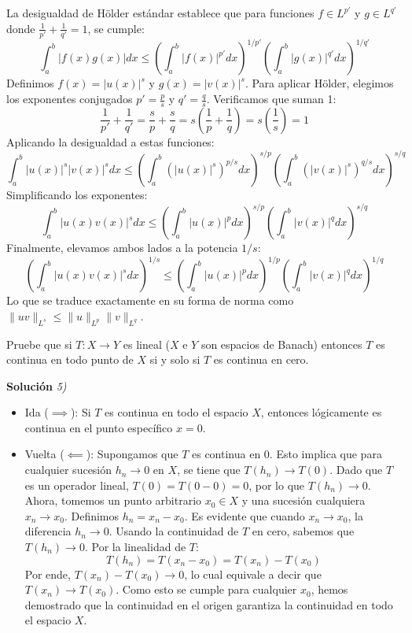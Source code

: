 \documentclass[11pt,spanish]{article}
\newcounter{problema}
\newcommand{\prob}{\stepcounter{problema} \vspace{.5cm} \noindent{\bf Problema \arabic{problema}: }}
\begin{document}
La desigualdad de Hölder estándar establece que para funciones $f \in L^{p'}$ y $g \in L^{q'}$ donde $\frac{1}{p'} + \frac{1}{q'} = 1$, se cumple:
$$\int_a^b |f(x)g(x)| dx \le \left( \int_a^b |f(x)|^{p'} dx \right)^{1/p'} \left( \int_a^b |g(x)|^{q'} dx \right)^{1/q'}$$
Definimos $f(x) = |u(x)|^s$ y $g(x) = |v(x)|^s$. Para aplicar Hölder, elegimos los exponentes conjugados $p' = \frac{p}{s}$ y $q' = \frac{q}{s}$. Verificamos que suman 1:
$$\frac{1}{p'} + \frac{1}{q'} = \frac{s}{p} + \frac{s}{q} = s \left( \frac{1}{p} + \frac{1}{q} \right) = s \left( \frac{1}{s} \right) = 1$$
Aplicando la desigualdad a estas funciones:
$$\int_a^b |u(x)|^s |v(x)|^s dx \le \left( \int_a^b (|u(x)|^s)^{p/s} dx \right)^{s/p} \left( \int_a^b (|v(x)|^s)^{q/s} dx \right)^{s/q}$$
Simplificando los exponentes:
$$\int_a^b |u(x)v(x)|^s dx \le \left( \int_a^b |u(x)|^p dx \right)^{s/p} \left( \int_a^b |v(x)|^q dx \right)^{s/q}$$
Finalmente, elevamos ambos lados a la potencia $1/s$:
$$\left( \int_a^b |u(x)v(x)|^s dx \right)^{1/s} \le \left( \int_a^b |u(x)|^p dx \right)^{1/p} \left( \int_a^b |v(x)|^q dx \right)^{1/q}$$
Lo que se traduce exactamente en su forma de norma como $\|uv\|_{L^s} \le \|u\|_{L^p} \|v\|_{L^q}$.


\prob Pruebe que si $T:X\to Y$ es lineal ($X$ e $Y$ son espacios de Banach) entonces $T$ es continua en todo punto de $X$ si y solo si $T$ es continua en cero.

\vspace{0.5cm}
{\bf Soluci\'on }{\em 5)}
\vspace{0.5cm}

\begin{itemize}

\item Ida ($\implies$): Si $T$ es continua en todo el espacio $X$, entonces lógicamente es continua en el punto específico $x = 0$.

\item Vuelta ($\impliedby$): Supongamos que $T$ es continua en $0$. Esto implica que para cualquier sucesión $h_n \to 0$ en $X$, se tiene que $T(h_n) \to T(0)$. Dado que $T$ es un operador lineal, $T(0) = T(0-0) = 0$, por lo que $T(h_n) \to 0$.
    Ahora, tomemos un punto arbitrario $x_0 \in X$ y una sucesión cualquiera $x_n \to x_0$.
    Definimos $h_n = x_n - x_0$. Es evidente que cuando $x_n \to x_0$, la diferencia $h_n \to 0$.
    Usando la continuidad de $T$ en cero, sabemos que $T(h_n) \to 0$. Por la linealidad de $T$:
    $$T(h_n) = T(x_n - x_0) = T(x_n) - T(x_0)$$
    Por ende, $T(x_n) - T(x_0) \to 0$, lo cual equivale a decir que $T(x_n) \to T(x_0)$. Como esto se cumple para cualquier $x_0$, hemos demostrado que la continuidad en el origen garantiza la continuidad en todo el espacio $X$.

\end{itemize}
\end{document}

